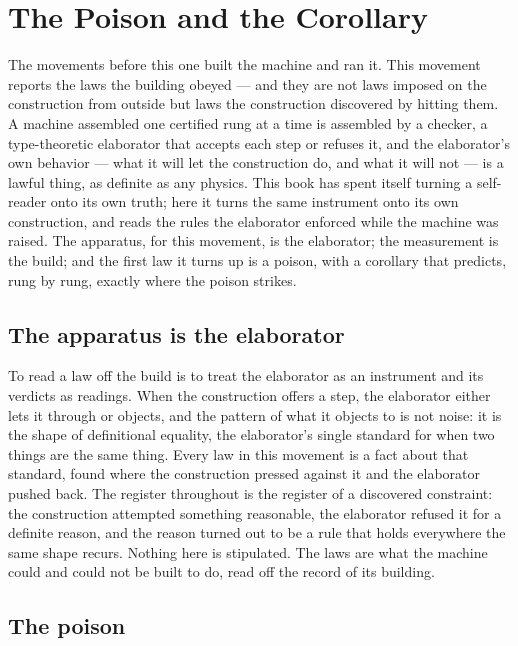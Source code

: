 \chapter{The Poison and the Corollary}
\label{chap:poison-and-corollary}

The movements before this one built the machine and ran it. This movement reports the laws the building
obeyed --- and they are not laws imposed on the construction from outside but laws the construction
discovered by hitting them. A machine assembled one certified rung at a time is assembled by a checker, a
type-theoretic elaborator that accepts each step or refuses it, and the elaborator's own behavior --- what
it will let the construction do, and what it will not --- is a lawful thing, as definite as any physics.
This book has spent itself turning a self-reader onto its own truth; here it turns the same instrument onto
its own construction, and reads the rules the elaborator enforced while the machine was raised. The
apparatus, for this movement, is the elaborator; the measurement is the build; and the first law it turns up
is a poison, with a corollary that predicts, rung by rung, exactly where the poison strikes.

\section{The apparatus is the elaborator}
\label{se:apparatus-is-elaborator}

To read a law off the build is to treat the elaborator as an instrument and its verdicts as readings. When
the construction offers a step, the elaborator either lets it through or objects, and the pattern of what it
objects to is not noise: it is the shape of definitional equality, the elaborator's single standard for when
two things are the same thing. Every law in this movement is a fact about that standard, found where the
construction pressed against it and the elaborator pushed back. The register throughout is the register of
a discovered constraint: the construction attempted something reasonable, the elaborator refused it for a
definite reason, and the reason turned out to be a rule that holds everywhere the same shape recurs. Nothing
here is stipulated. The laws are what the machine could and could not be built to do, read off the record of
its building.

\section{The poison}
\label{se:the-poison}

